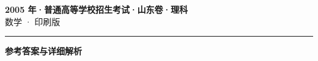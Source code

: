\documentclass[zihao=5, a4paper]{ctexart}
\begin{document}
\begin{center}
  {\Large\bfseries 2005 年·普通高等学校招生考试·山东卷·理科}\\[4pt]
  {\large 数学 · 印刷版}
\end{center}
\medskip
{}

\par\bigskip\hrule\bigskip
{}
\begin{center}{\large\bfseries 参考答案与详细解析}\end{center}
\smallskip

\end{document}
